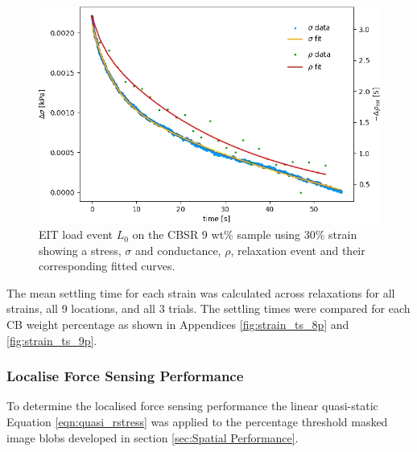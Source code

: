 \begin{figure}[H]
    \centering
    \includegraphics[width=0.7\linewidth]{Figures/2D Push event 0 - CBSR 9 wt 30p strain - 2D compressionv2.jpg}
    \caption{EIT load event $L_0$ on the CBSR 9 wt\% sample using 30\% strain showing a stress, $\sigma$ and conductance, $\rho$, relaxation event and their corresponding fitted curves.}
    \label{fig:blob_global_relaxation}
\end{figure}

The mean settling time for each strain was calculated across relaxations for all strains, all 9 locations, and all 3 trials. The settling times were compared for each CB weight percentage as shown in Appendices \ref{fig:strain_ts_8p} and \ref{fig:strain_ts_9p}.

\subsubsection{Localise Force Sensing Performance}\label{sec:Localised Force Sensing Performance2}
To determine the localised force sensing performance the linear quasi-static Equation \ref{eqn:quasi_rstress} was applied to the percentage threshold masked image blobs developed in section \ref{sec:Spatial Performance}.

